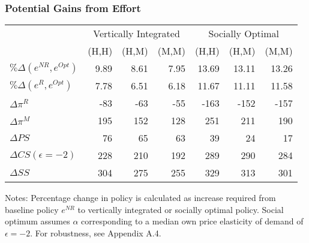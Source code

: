 \begin{frame}
\frametitle{Potential Gains from Effort}
\begin{table}[htp]
\begin{center}
\begin{tabular}{|l | r r r | r r r |}
\hline
&  \multicolumn{3}{c|}{Vertically Integrated}& \multicolumn{3}{c|}{Socially Optimal}\\ 
 & (H,H) & (H,M) & (M,M)  & (H,H) & (H,M) & (M,M) \\ \hline
$\%\Delta(e^{NR}, e^{Opt})$ & 9.89 & 8.61 & 7.95 & 13.69 & 13.11 & 13.26 \\
$\%\Delta(e^{R}, e^{Opt})$ & 7.78 & 6.51 & 6.18 & 11.67 & 11.11 & 11.58 
 \\ \hline
$\Delta \pi^R$ & -83 & -63 & -55 & -163 & -152 & -157 \\
$\Delta \pi^M$ & 195 & 152 & 128 & 251 & 211 & 190 \\
$\Delta PS$ & 76 & 65 & 63 & 39 & 24 & 17 \\
$\Delta CS  (\epsilon=-2)$ & 228 & 210 & 192 & 289 & 290 & 284 \\
$\Delta SS$ & 304 & 275 & 255 & 329 & 313 & 301 \\ \hline
\end{tabular} 
\end{center}
\label{tab:effortnew}
\footnotesize
Notes: Percentage change in policy is calculated as increase required from baseline policy $e^{NR}$ to vertically integrated or socially optimal policy. Social optimum assumes $\alpha$ corresponding to a median own price elasticity of demand of $\epsilon=-2$. For robustness, see Appendix A.4.
\end{table}
\end{frame}





